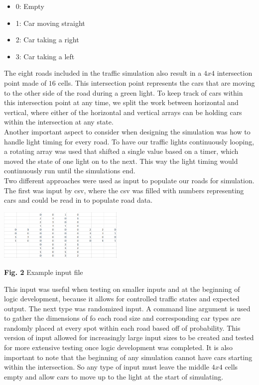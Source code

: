 \documentclass[conference]{IEEEtran}
\begin{document}
\begin{itemize}
	\item 0: Empty
	\item 1: Car moving straight
	\item 2: Car taking a right
	\item 3: Car taking a left \\
\end{itemize}

The eight roads included in the traffic simulation also result in a $4x4$ intersection point made of $16$ cells. This intersection point represents the cars that are moving to the other side of the road during a green light. To keep track of cars within this intersection point at any time, we split the work between horizontal and vertical, where either of the horizontal and vertical arrays can be holding cars within the intersection at any state. \\

Another important aspect to consider when designing the simulation was how to handle light timing for every road. To have our traffic lights continuously looping, a rotating array was used that shifted a single value based on a timer, which moved the state of one light on to the next. This way the light timing would continuously run until the simulations end.\\

\hspace*{.2cm} Two different approaches were used as input to populate our roads for simulation. The first was input by csv, where the csv was filled with numbers representing cars and could be read in to populate road data. 

\includegraphics[width=0.45\textwidth]{images/input}
\begin{center}
	\textbf{Fig. 2} Example input file  \\
\end{center}

This input was useful when testing on smaller inputs and at the beginning of logic development, because it allows for controlled traffic states and expected output. The next type was randomized input. A command line argument is used to gather the dimensions of fo each road size and corresponding car types are randomly placed at every spot within each road based off of probability. This version of input allowed for increasingly large input sizes to be created and tested for more extensive testing once logic development was completed. It is also important to note that the beginning of any simulation cannot have cars starting within the intersection. So any type of input must leave the middle $4x4$ cells empty and allow cars to move up to the light at the start of simulating. \\
\end{document}
